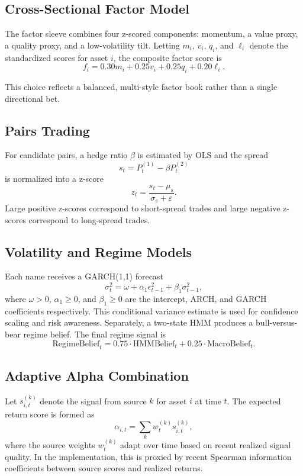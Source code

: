 \documentclass[10pt,twocolumn]{article}
\begin{document}
\subsection{Cross-Sectional Factor Model}

The factor sleeve combines four z-scored components: momentum, a value proxy, a
quality proxy, and a low-volatility tilt. Letting $m_i$, $v_i$, $q_i$, and
$\ell_i$ denote the standardized scores for asset
$i$, the composite factor score is
\[
f_i = 0.30 m_i + 0.25 v_i + 0.25 q_i + 0.20 \ell_i.
\]

This choice reflects a balanced, multi-style factor book rather than a single
directional bet.

\subsection{Pairs Trading}

For candidate pairs, a hedge ratio $\beta$ is estimated by OLS and the spread
\[
s_t = P^{(1)}_t - \beta P^{(2)}_t
\]
is normalized into a z-score
\[
z_t = \frac{s_t - \mu_s}{\sigma_s + \varepsilon}.
\]
Large positive z-scores correspond to short-spread trades and large negative
z-scores correspond to long-spread trades.

\subsection{Volatility and Regime Models}

Each name receives a GARCH(1,1) forecast
\[
\sigma_t^2 = \omega + \alpha_1 \epsilon_{t-1}^2 + \beta_1 \sigma_{t-1}^2,
\]
where $\omega > 0$, $\alpha_1 \geq 0$, and $\beta_1 \geq 0$ are the intercept,
ARCH, and GARCH coefficients respectively. This conditional variance estimate
is used for confidence scaling and risk awareness. Separately, a two-state
HMM produces a bull-versus-bear regime belief. The final regime signal is
\[
\text{RegimeBelief}_t =
0.75 \cdot \text{HMMBelief}_t +
0.25 \cdot \text{MacroBelief}_t.
\]

\subsection{Adaptive Alpha Combination}

Let $s^{(k)}_{i,t}$ denote the signal from source $k$ for asset $i$ at time $t$.
The expected return score is formed as
\[
\alpha_{i,t} = \sum_k w^{(k)}_t s^{(k)}_{i,t},
\]
where the source weights $w^{(k)}_t$ adapt over time based on recent realized
signal quality. In the implementation, this is proxied by recent Spearman
information coefficients between source scores and realized returns.
\end{document}
